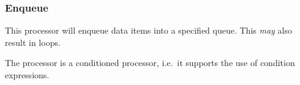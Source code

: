 \subsubsection{Enqueue}

This processor will enqueue data items into a specified queue. This
\emph{may} also result in loops.

The processor is a conditioned processor, i.e.~it supports the use of
condition expressions.

